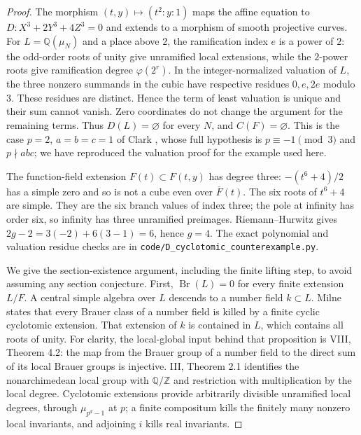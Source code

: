 \begin{proof}
The morphism $(t,y)\mapsto(t^2:y:1)$ maps the affine equation to
$D:X^3+2Y^3+4Z^3=0$ and extends to a morphism of smooth projective curves.
For $L=\mathbb Q(\mu_N)$ and a place above $2$, the ramification index
$e$ is a power of $2$: the odd-order roots of unity give unramified local
extensions, while the $2$-power roots give ramification degree
$\varphi(2^r)$.  In the integer-normalized valuation of $L$, the three
nonzero summands in the cubic have respective residues $0,e,2e$ modulo
$3$.  These residues are distinct.  Hence the term of least valuation is
unique and their sum cannot vanish.  Zero coordinates do not change the
argument for the remaining terms.  Thus $D(L)=\varnothing$ for every
$N$, and $C(F)=\varnothing$.  This is the case $p=2$, $a=b=c=1$ of
Clark \cite[Theorem 1]{D_Clark2006}, whose full hypothesis is
$p\equiv-1\pmod3$ and $p\nmid abc$; we have reproduced the valuation
proof for the example used here.

The function-field extension $F(t)\subset F(t,y)$ has degree three:
$-(t^6+4)/2$ has a simple zero and so is not a cube even over
$\overline F(t)$.  The six roots of $t^6+4$ are simple.  They are the six
branch values of index three; the pole at infinity has order six, so
infinity has three unramified preimages.  Riemann--Hurwitz gives
$2g-2=3(-2)+6(3-1)=6$, hence $g=4$.  The exact polynomial and valuation
residue checks are in \texttt{code/D\_cyclotomic\_counterexample.py}.

We give the section-existence argument, including the finite lifting
step, to avoid assuming any section conjecture.  First,
$\operatorname{Br}(L)=0$ for every finite extension $L/F$.
A central simple algebra over $L$ descends to a number field $k\subset L$.
Milne \cite[VII, Proposition 7.2]{D_MilneCFT} states that every Brauer
class of a number field is killed by a finite cyclic cyclotomic extension.
That extension of $k$ is contained in $L$, which contains all roots of
unity.  For clarity, the local-global input behind that proposition is
VIII, Theorem 4.2: the map from the Brauer group of a number field to the
direct sum of its local Brauer groups is injective.  III, Theorem 2.1
identifies the nonarchimedean local group with $\mathbb Q/\mathbb Z$ and
restriction with multiplication by the local degree.  Cyclotomic
extensions provide arbitrarily divisible unramified local degrees,
through $\mu_{p^d-1}$ at $p$; a finite compositum kills the finitely many
nonzero local invariants, and adjoining $i$ kills real invariants.


\end{proof}
